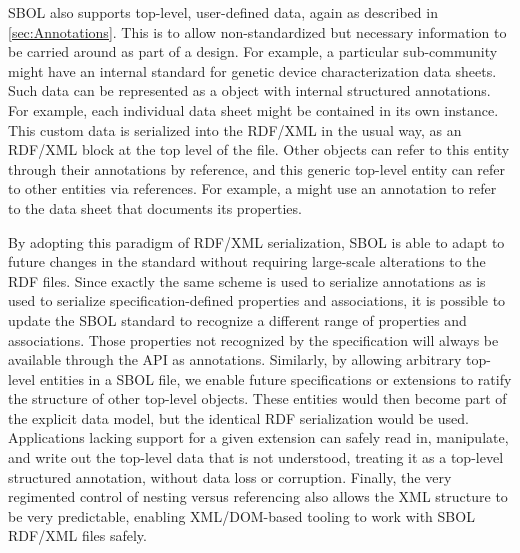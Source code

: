 SBOL also supports top-level, user-defined data, again as described in \ref{sec:Annotations}. This is to allow non-standardized but necessary information to be carried around as part of a design. For example, a particular sub-community might have an internal standard for genetic device characterization data sheets. 
Such data can be represented as a  object with internal structured annotations. 
For example, each individual data sheet might be contained in its own  instance.
This custom data is serialized into the RDF/XML in the usual way, as an RDF/XML block at the top level of the file. 
Other objects can refer to this entity through their annotations by reference, and this generic top-level entity can refer to other entities via references.
For example, a  might use an annotation to refer to the data sheet  that documents its properties.


By adopting this paradigm of RDF/XML serialization, SBOL is able to adapt to future changes in the standard without requiring large-scale alterations to the RDF files. Since exactly the same scheme is used to serialize annotations as is used to serialize specification-defined properties and associations, it is possible to update the SBOL standard to recognize a different range of properties and associations. Those properties not recognized by the specification will always be available through the API as annotations. Similarly, by allowing arbitrary top-level entities in a SBOL file, we enable future specifications or extensions to ratify the structure of other top-level objects. These entities would then become part of the explicit data model, but the identical RDF serialization would be used. Applications lacking support for a given extension can safely read in, manipulate, and write out the top-level data that is not understood, treating it as a top-level structured annotation, without data loss or corruption. Finally, the very regimented control of nesting versus referencing also allows the XML structure to be very predictable, enabling XML/DOM-based tooling to work with SBOL RDF/XML files safely.
